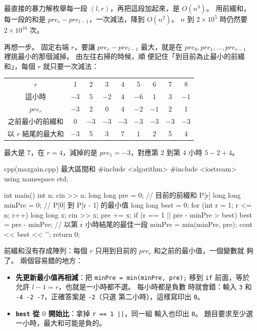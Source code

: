 最直接的暴力解枚舉每一段 $(l, r)$，再把這段加起來，是 $O(n^3)$。 用前綴和，
每一段的和是 $pre_r - pre_{l-1}$，一次減法，降到 $O(n^2)$。 $n$ 到
$2 \times 10^5$ 時仍然要 $2 \times 10^{10}$ 次。

再想一步。 固定右端 $r$，要讓 $pre_r - pre_{l-1}$ 最大，就是在
$pre_0, pre_1, \ldots, pre_{r-1}$ 裡挑最小的那個減掉。 由左往右掃的時候，順
便記住「到目前為止最小的前綴和」，每個 $r$ 就只要一次減法：

\begin{center}
\begin{tabular}{ccccccccc}
\toprule
$r$ & 1 & 2 & 3 & 4 & 5 & 6 & 7 & 8 \\
這小時 & $-3$ & 5 & $-2$ & 4 & $-6$ & 1 & 3 & $-1$ \\
$pre_r$ & $-3$ & 2 & 0 & 4 & $-2$ & $-1$ & 2 & 1 \\
之前最小的前綴和 & 0 & $-3$ & $-3$ & $-3$ & $-3$ & $-3$ & $-3$ & $-3$ \\
以 $r$ 結尾的最大和 & $-3$ & 5 & 3 & 7 & 1 & 2 & 5 & 4 \\
\bottomrule
\end{tabular}
\end{center}

最大是 $7$，在 $r = 4$，減掉的是 $pre_1 = -3$，對應第 $2$ 到第 $4$ 小時
$5 - 2 + 4$。

\begin{example}[label=ex:ps-maxgain]{cpp}{(maxgain.cpp) 最大區間和}
#include <algorithm>
#include <iostream>
using namespace std;

int main() {
    int n;
    cin >> n;
    long long pre = 0;         // 目前的前綴和 P[r]
    long long minPre = 0;      // P[0] 到 P[r - 1] 的最小值
    long long best = 0;
    for (int r = 1; r <= n; r++) {
        long long x;
        cin >> x;
        pre += x;
        if (r == 1 || pre - minPre > best) {
            best = pre - minPre;   // 以第 r 小時結尾的最佳一段
        }
        minPre = min(minPre, pre);
    }
    cout << best << '\n';
    return 0;
}
\end{example}


前綴和沒有存成陣列：每個 $r$ 只用到目前的 $pre_r$ 和之前的最小值，一個變數就
夠了。 兩個容易錯的地方：

\begin{itemize}
\item \textbf{先更新最小值再相減}：把 \texttt{minPre = min(minPre, pre);} 移到
\texttt{if} 前面，等於允許 $l - 1 = r$，也就是一小時都不選。 每小時都是負數
時就會錯：輸入 \texttt{3} 和 \texttt{-4 -2 -7}，正確答案是 \texttt{-2}（只選
第二小時），這樣寫印出 \texttt{0}。
\item \textbf{\texttt{best} 從 $0$ 開始比}：拿掉 \texttt{r == 1 ||}，同一組
輸入也印出 \texttt{0}。 題目要求至少選一小時，最大和可能是負的。
\end{itemize}

